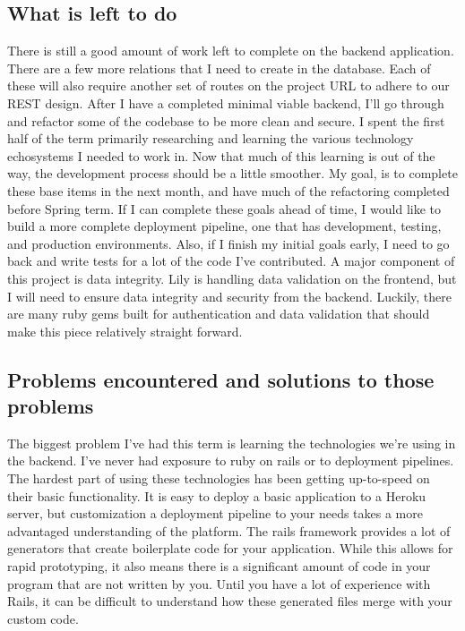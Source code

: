 \documentclass[draftclsnofoot,onecolumn,letterpaper,10pt,compsoc]{IEEEtran}
\begin{document}
\subsection{What is left to do}
There is still a good amount of work left to complete on the backend application.
There are a few more relations that I need to create in the database.
Each of these will also require another set of routes on the project URL to adhere to our REST design.
After I have a completed minimal viable backend, I’ll go through and refactor some of the codebase to be more clean and secure.
I spent the first half of the term primarily researching and learning the various technology echosystems I needed to work in.
Now that much of this learning is out of the way, the development process should be a little smoother.
My goal, is to complete these base items in the next month, and have much of the refactoring completed before Spring term.
If I can complete these goals ahead of time, I would like to build a more complete deployment pipeline, one that has development, testing, and production environments.
Also, if I finish my initial goals early, I need to go back and write tests for a lot of the code I've contributed.
A major component of this project is data integrity.
Lily is handling data validation on the frontend, but I will need to ensure data integrity and security from the backend.
Luckily, there are many ruby gems built for authentication and data validation that should make this piece relatively straight forward.

\subsection{Problems encountered and solutions to those problems}
The biggest problem I’ve had this term is learning the technologies we’re using in the backend.
I’ve never had exposure to ruby on rails or to deployment pipelines.
The hardest part of using these technologies has been getting up-to-speed on their basic functionality.
It is easy to deploy a basic application to a Heroku server, but customization a deployment pipeline to your needs takes a more advantaged understanding of the platform.
The rails framework provides a lot of generators that create boilerplate code for your application.
While this allows for rapid prototyping, it also means there is a significant amount of code in your program that are not written by you.
Until you have a lot of experience with Rails, it can be difficult to understand how these generated files merge with your custom code.
\end{document}
